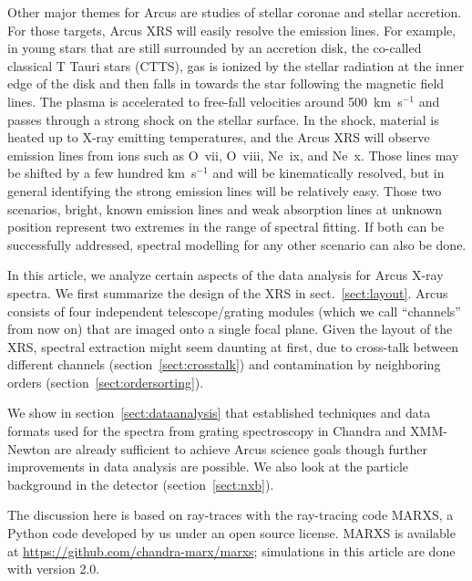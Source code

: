 \documentclass[12pt]{spieman}  %
\begin{document}
\begin{spacing}{2}
Other major themes for Arcus are studies of stellar coronae and stellar accretion. For those targets, Arcus XRS will easily resolve the emission lines. For example, in young stars that are still surrounded by an accretion disk, the co-called classical T Tauri stars (CTTS), gas is ionized by the stellar radiation at the inner edge of the disk and then falls in towards  the star following the magnetic field lines. The plasma is accelerated to free-fall velocities around 500~km~s$^{-1}$ and passes through a strong shock on the stellar surface. In the shock, material is heated up to X-ray emitting temperatures, and the Arcus XRS will observe emission lines from ions such as O~{\sc vii}, O~{\sc viii}, Ne~{\sc ix}, and Ne~{\sc x}\cite{2022hxga.book...57S}. Those lines may be shifted by a few hundred km~s$^{-1}$ and will be kinematically resolved, but in general identifying the strong emission lines will be relatively easy. Those two scenarios, bright, known emission lines and weak absorption lines at unknown position represent two extremes in the range of spectral fitting. If both can be successfully addressed, spectral modelling for any other scenario can also be done.

In this article, we analyze certain aspects of the data analysis for Arcus X-ray spectra.
We first summarize the design of the XRS in sect.~\ref{sect:layout}. Arcus consists of four independent telescope/grating modules (which we call ``channels'' from now on) that are imaged onto a single focal plane.
Given the layout of the XRS, spectral extraction might seem daunting at first, due to cross-talk between different channels (section~\ref{sect:crosstalk}) and contamination by neighboring orders (section~\ref{sect:ordersorting}).

We show in section~\ref{sect:dataanalysis} that established techniques and data formats used for the spectra from grating spectroscopy in Chandra and XMM-Newton are already sufficient to achieve Arcus science goals though further improvements in data analysis are possible. We also look at the particle background in the detector (section~\ref{sect:nxb}).

The discussion here is based on ray-traces with the ray-tracing code MARXS\cite{2017AJ....154..243G,marxs2.0}, a Python code developed by us under an open source license. MARXS is available at \url{https://github.com/chandra-marx/marxs}; simulations in this article are done with version 2.0.



\end{spacing}
\end{document}
